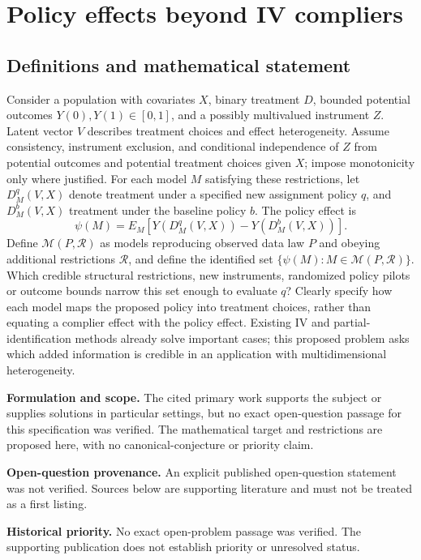 \documentclass[11pt]{article}
\begin{document}
\section*{Policy effects beyond IV compliers}\label{30007706}
\subsection{Definitions and mathematical statement}
Consider a population with covariates \(X\), binary treatment \(D\), bounded potential outcomes \(Y(0),Y(1)\in[0,1]\), and a possibly multivalued instrument \(Z\). Latent vector \(V\) describes treatment choices and effect heterogeneity. Assume consistency, instrument exclusion, and conditional independence of \(Z\) from potential outcomes and potential treatment choices given \(X\); impose monotonicity only where justified. For each model \(M\) satisfying these restrictions, let \(D_M^q(V,X)\) denote treatment under a specified new assignment policy \(q\), and \(D_M^b(V,X)\) treatment under the baseline policy \(b\). The policy effect is
\[
\psi(M)=E_M[Y(D_M^q(V,X))-Y(D_M^b(V,X))].
\]
Define \(\mathcal M(P,\mathcal R)\) as models reproducing observed data law \(P\) and obeying additional restrictions \(\mathcal R\), and define the identified set \(\{\psi(M):M\in\mathcal M(P,\mathcal R)\}\). Which credible structural restrictions, new instruments, randomized policy pilots or outcome bounds narrow this set enough to evaluate \(q\)? Clearly specify how each model maps the proposed policy into treatment choices, rather than equating a complier effect with the policy effect. Existing IV and partial-identification methods already solve important cases; this proposed problem asks which added information is credible in an application with multidimensional heterogeneity.

\par\textbf{Formulation and scope.} The cited primary work supports the subject or supplies solutions in particular settings, but no exact open-question passage for this specification was verified. The mathematical target and restrictions are proposed here, with no canonical-conjecture or priority claim.

\par\textbf{Open-question provenance.} An explicit published open-question statement was not verified. Sources below are supporting literature and must not be treated as a first listing.

\par\textbf{Historical priority.} No exact open-problem passage was verified. The supporting publication does not establish priority or unresolved status.
\end{document}

